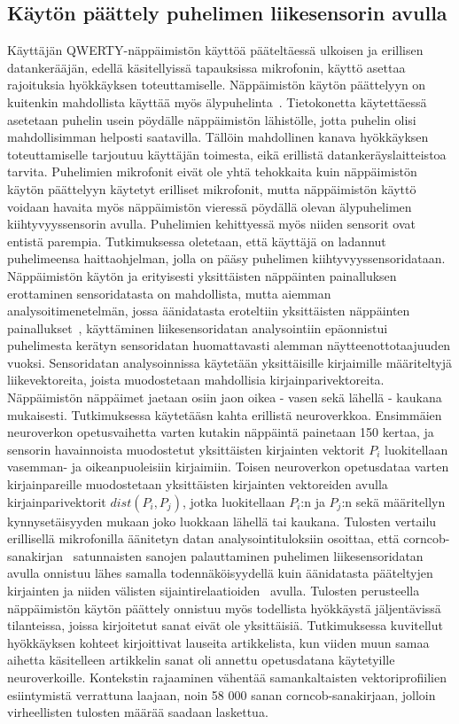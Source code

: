 \documentclass[finnish]{tktltiki2}
\theoremstyle{definition}
\theoremstyle{remark}
\begin{document}
\subsection{Käytön päättely puhelimen liikesensorin avulla}
Käyttäjän QWERTY-näppäimistön käyttöä pääteltäessä ulkoisen ja erillisen datankerääjän, edellä käsitellyissä tapauksissa mikrofonin, käyttö asettaa rajoituksia hyökkäyksen toteuttamiselle. Näppäimistön käytön päättelyyn on kuitenkin mahdollista käyttää myös älypuhelinta~\cite{mar}. Tietokonetta käytettäessä asetetaan puhelin usein pöydälle näppäimistön lähistölle, jotta puhelin olisi mahdollisimman helposti saatavilla. Tällöin mahdollinen kanava hyökkäyksen toteuttamiselle tarjoutuu käyttäjän toimesta, eikä erillistä datankeräyslaitteistoa tarvita. Puhelimien mikrofonit eivät ole yhtä tehokkaita kuin näppäimistön käytön päättelyyn käytetyt erilliset mikrofonit, mutta näppäimistön käyttö voidaan havaita myös näppäimistön vieressä pöydällä olevan älypuhelimen kiihtyvyyssensorin avulla. Puhelimien kehittyessä myös niiden sensorit ovat entistä parempia. 
Tutkimuksessa oletetaan, että käyttäjä on ladannut puhelimeensa haittaohjelman, jolla on pääsy puhelimen kiihtyvyyssensoridataan. Näppäimistön käytön ja erityisesti yksittäisten näppäinten painalluksen erottaminen sensoridatasta on mahdollista, mutta aiemman analysoitimenetelmän, jossa äänidatasta eroteltiin yksittäisten näppäinten painallukset~\cite{aso}, käyttäminen liikesensoridatan analysointiin epäonnistui puhelimesta kerätyn sensoridatan huomattavasti alemman näytteenottotaajuuden vuoksi. Sensoridatan analysoinnissa  käytetään yksittäisille kirjaimille määriteltyjä liikevektoreita, joista muodostetaan mahdollisia kirjainparivektoreita. Näppäimistön näppäimet jaetaan osiin jaon oikea - vasen sekä lähellä - kaukana mukaisesti. Tutkimuksessa käytetääsn kahta erillistä neuroverkkoa. Ensimmäien neuroverkon opetusvaihetta varten kutakin näppäintä painetaan 150 kertaa, ja sensorin havainnoista muodostetut yksittäisten kirjainten vektorit $P_i$ luokitellaan vasemman- ja oikeanpuoleisiin kirjaimiin. Toisen neuroverkon opetusdataa varten kirjainpareille muodostetaan yksittäisten kirjainten vektoreiden avulla kirjainparivektorit $dist(P_i,P_j)$, jotka luokitellaan $P_i$:n ja $P_j$:n sekä määritellyn kynnysetäisyyden mukaan joko luokkaan lähellä tai kaukana. Tulosten vertailu erillisellä mikrofonilla äänitetyn datan analysointituloksiin osoittaa, että corncob-sanakirjan~\cite{corn} satunnaisten sanojen palauttaminen puhelimen liikesensoridatan avulla onnistuu lähes samalla todennäköisyydellä kuin äänidatasta pääteltyjen kirjainten ja niiden välisten sijaintirelaatioiden~\cite{berger} avulla. Tulosten perusteella näppäimistön käytön päättely onnistuu myös todellista hyökkäystä jäljentävissä tilanteissa, joissa kirjoitetut sanat eivät ole yksittäisiä. Tutkimuksessa kuvitellut hyökkäyksen kohteet kirjoittivat lauseita artikkelista, kun viiden muun samaa aihetta käsitelleen artikkelin sanat oli annettu opetusdatana käytetyille neuroverkoille. Kontekstin rajaaminen vähentää samankaltaisten vektoriprofiilien esiintymistä verrattuna laajaan, noin 58 000 sanan corncob-sanakirjaan, jolloin virheellisten tulosten määrää saadaan laskettua. \linebreak \linebreak
 
\end{document}
